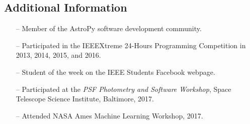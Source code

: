 \documentclass[10pt]{article}
\begin{document}
\begin{titlepage}
\section*{Additional Information}
\begin{itemize}
    \item[--] Member of the AstroPy software development community.
    \item[--] Participated in the IEEEXtreme 24-Hours Programming Competition in 2013, 2014, 2015, and 2016.
    \item[--] Student of the week on the IEEE Students Facebook webpage.
    \item[--] Participated at the \textit{PSF Photometry and Software Workshop}, Space Telescope Science Institute, Baltimore, 2017.
    \item[--] Attended NASA Ames Machine Learning Workshop, 2017.
\end{itemize}

\end{titlepage}
\end{document}
